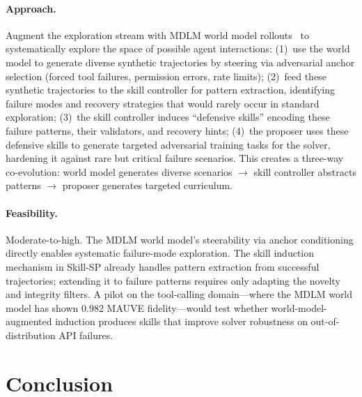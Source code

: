 \documentclass[11pt,a4paper]{article}
\begin{document}
\paragraph{Approach.}
Augment the exploration stream with MDLM world model rollouts~\cite{deshpande2026masked} to systematically explore the space of possible agent interactions: (1)~use the world model to generate diverse synthetic trajectories by steering via adversarial anchor selection (forced tool failures, permission errors, rate limits); (2)~feed these synthetic trajectories to the skill controller for pattern extraction, identifying failure modes and recovery strategies that would rarely occur in standard exploration; (3)~the skill controller induces ``defensive skills'' encoding these failure patterns, their validators, and recovery hints; (4)~the proposer uses these defensive skills to generate targeted adversarial training tasks for the solver, hardening it against rare but critical failure scenarios. This creates a three-way co-evolution: world model generates diverse scenarios $\to$ skill controller abstracts patterns $\to$ proposer generates targeted curriculum.

\paragraph{Feasibility.}
Moderate-to-high. The MDLM world model's steerability via anchor conditioning directly enables systematic failure-mode exploration. The skill induction mechanism in Skill-SP already handles pattern extraction from successful trajectories; extending it to failure patterns requires only adapting the novelty and integrity filters. A pilot on the tool-calling domain---where the MDLM world model has shown 0.982 MAUVE fidelity---would test whether world-model-augmented induction produces skills that improve solver robustness on out-of-distribution API failures.

\section{Conclusion}
\end{document}
